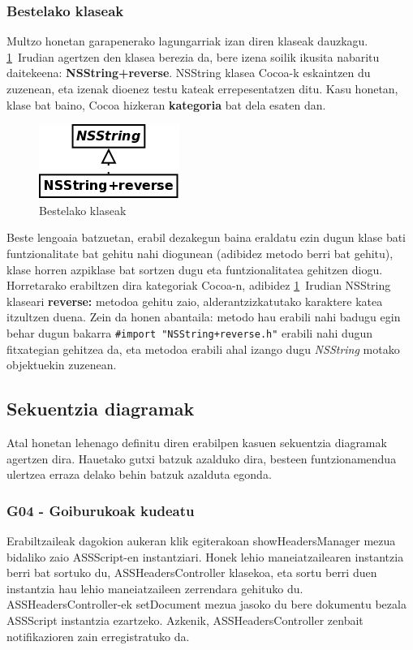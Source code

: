 \subsubsection{Bestelako klaseak}
Multzo honetan garapenerako lagungarriak izan diren klaseak dauzkagu. \ref{kd-others}~Irudian agertzen den klasea berezia da, bere izena soilik ikusita nabaritu daitekeena: \textbf{NSString+reverse}. NSString klasea Cocoa-k eskaintzen du zuzenean, eta izenak dioenez testu kateak errepesentatzen ditu. Kasu honetan, klase bat baino, Cocoa hizkeran \textbf{kategoria} bat dela esaten dan.
\begin{figure}[htp]
\begin{center}
\includegraphics[scale=0.4]{Pictures/Chapter4/Diseinua/KD-Others.png}
\caption{Bestelako klaseak}
\label{kd-others}
\end{center}
\end{figure}
Beste lengoaia batzuetan, erabil dezakegun baina eraldatu ezin dugun klase bati funtzionalitate bat gehitu nahi diogunean (adibidez metodo berri bat gehitu), klase horren azpiklase bat sortzen dugu eta funtzionalitatea gehitzen diogu. Horretarako erabiltzen dira kategoriak Cocoa-n, adibidez \ref{kd-others}~Irudian NSString klaseari \textbf{reverse:} metodoa gehitu zaio, alderantzizkatutako karaktere katea itzultzen duena. Zein da honen abantaila: metodo hau erabili nahi badugu egin behar dugun bakarra \texttt{\#import "NSString+reverse.h"} erabili nahi dugun fitxategian gehitzea da, eta metodoa erabili ahal izango dugu \textit{NSString} motako objektuekin zuzenean.

\newpage
\subsection{Sekuentzia diagramak}
Atal honetan lehenago definitu diren erabilpen kasuen sekuentzia diagramak agertzen dira. Hauetako gutxi batzuk azalduko dira, besteen funtzionamendua ulertzea erraza delako behin batzuk azalduta egonda.

\subsubsection{G04 - Goiburukoak kudeatu}
Erabiltzaileak dagokion aukeran klik egiterakoan showHeadersManager mezua bidaliko zaio ASSScript-en instantziari. Honek lehio maneiatzailearen instantzia berri bat sortuko du, ASSHeadersController klasekoa, eta sortu berri duen instantzia hau lehio maneiatzaileen zerrendara gehituko du. ASSHeadersController-ek setDocument mezua jasoko du bere dokumentu bezala ASSScript instantzia ezartzeko. Azkenik, ASSHeadersController zenbait notifikazioren zain erregistratuko da.

